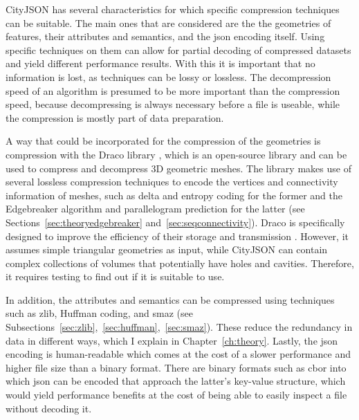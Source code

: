 CityJSON has several characteristics for which specific compression techniques can be suitable.
The main ones that are considered are the the geometries of features, their attributes and semantics, and the \ac{json} encoding itself.
Using specific techniques on them can allow for partial decoding of compressed datasets and yield different performance results.
With this it is important that no information is lost, as techniques can be lossy or lossless.
The decompression speed of an algorithm is presumed to be more important than the compression speed, because decompressing is always necessary before a file is useable, while the compression is mostly part of data preparation.

A way that could be incorporated for the compression of the geometries is compression with the Draco library \citep{draco}, which is an open-source library and can be used to compress and decompress 3D geometric meshes.
The library makes use of several lossless compression techniques to encode the vertices and connectivity information of meshes, such as delta and entropy coding for the former and the Edgebreaker algorithm and parallelogram prediction for the latter (see Sections~\ref{sec:theoryedgebreaker} and~\ref{sec:seqconnectivity}).
Draco is specifically designed to improve the efficiency of their storage and transmission \citep{draco}.
However, it assumes simple triangular geometries as input, while CityJSON can contain complex collections of volumes that potentially have holes and cavities.
Therefore, it requires testing to find out if it is suitable to use.

In addition, the attributes and semantics can be compressed using techniques such as zlib, Huffman coding, and smaz (see Subsections~\ref{sec:zlib},~\ref{sec:huffman},~\ref{sec:smaz}).
These reduce the redundancy in data in different ways, which I explain in Chapter~\ref{ch:theory}. 
Lastly, the \ac{json} encoding is human-readable which comes at the cost of a slower performance and higher file size than a binary format.
There are binary formats such as \ac{cbor} into which \ac{json} can be encoded that approach the latter's key-value structure, which would yield performance benefits at the cost of being able to easily inspect a file without decoding it.



